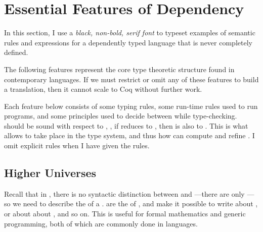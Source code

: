 {
\section{Essential Features of Dependency}
\label{sec:design}
\renewcommand{\sfont}{\mathrm}
\renewcommand{\scolor}{\gcolor}
\renewcommand{\sfontsym}{\gfontsym}

\begin{typographical}
In this section, I use a \emph{\textrm{black, non-bold, serif font}} to typeset
examples of semantic rules and expressions for a dependently typed language that
is never completely defined.
\end{typographical}

The following features represent the core type theoretic structure found in
contemporary  languages.
If we must restrict or omit any of these features to build a
 translation, then it cannot scale to Coq without further
work.

Each feature below consists of some typing rules, some run-time 
rules used to run programs, and some  principles used to
decide  between  while type-checking.
 should be sound with respect to , \ie, if
\im{\ge} reduces to \im{\gepr}, then \im{\ge} is also  to
\im{\gepr}.
This is what allows  to take place in the type system, and thus
how  can compute and refine .
I omit explicit  rules when I have given the 
rules.

\subsection{Higher Universes}
Recall that in  , there is no
syntactic distinction between  and ---there are only
---so we need to describe the  of a .
 are the 
of , and  make it possible to write
 about , or  about
 about , and so on. This is useful for formal
mathematics and generic programming, both of which are
commonly done in  languages.

}
